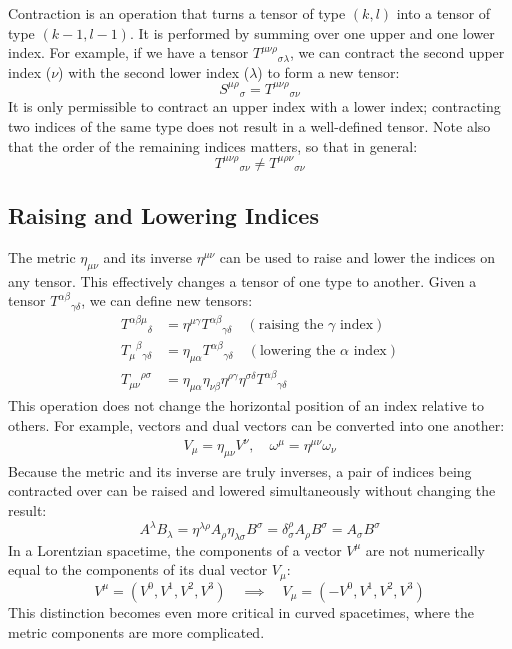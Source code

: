 \documentclass[11pt, a4paper]{report}
\begin{document}
Contraction is an operation that turns a tensor of type $(k, l)$ into a tensor of type $(k-1, l-1)$. It is performed by summing over one upper and one lower index. For example, if we have a tensor ${T^{\mu\nu\rho}}_{\sigma\lambda}$, we can contract the second upper index ($\nu$) with the second lower index ($\lambda$) to form a new tensor:
\begin{equation}
    {S^{\mu\rho}}_\sigma = {T^{\mu\nu\rho}}_{\sigma\nu}
\end{equation}
It is only permissible to contract an upper index with a lower index; contracting two indices of the same type does not result in a well-defined tensor. Note also that the order of the remaining indices matters, so that in general:
\begin{equation}
    {T^{\mu\nu\rho}}_{\sigma\nu} \ne {T^{\mu\rho\nu}}_{\sigma\nu}
\end{equation}

\subsection*{Raising and Lowering Indices}

The metric $\eta_{\mu\nu}$ and its inverse $\eta^{\mu\nu}$ can be used to raise and lower the indices on any tensor. This effectively changes a tensor of one type to another. Given a tensor ${T^{\alpha\beta}}_{\gamma\delta}$, we can define new tensors:
\begin{align}
    {T^{\alpha\beta\mu}}_\delta &= \eta^{\mu\gamma} {T^{\alpha\beta}}_{\gamma\delta} \quad (\text{raising the } \gamma \text{ index}) \\
    {T_\mu}^{\beta}{}_{\gamma\delta} &= \eta_{\mu\alpha} {T^{\alpha\beta}}_{\gamma\delta} \quad (\text{lowering the } \alpha \text{ index}) \\
    {T_{\mu\nu}}^{\rho\sigma} &= \eta_{\mu\alpha}\eta_{\nu\beta}\eta^{\rho\gamma}\eta^{\sigma\delta} {T^{\alpha\beta}}_{\gamma\delta}
\end{align}
This operation does not change the horizontal position of an index relative to others. For example, vectors and dual vectors can be converted into one another:
\begin{align}
    V_\mu = \eta_{\mu\nu}V^\nu, \quad \omega^\mu = \eta^{\mu\nu}\omega_\nu
\end{align}
Because the metric and its inverse are truly inverses, a pair of indices being contracted over can be raised and lowered simultaneously without changing the result:
\begin{equation}
    A^\lambda B_\lambda = \eta^{\lambda\rho}A_\rho \eta_{\lambda\sigma}B^\sigma = \delta^\rho_\sigma A_\rho B^\sigma = A_\sigma B^\sigma
\end{equation}
In a Lorentzian spacetime, the components of a vector $V^\mu$ are not numerically equal to the components of its dual vector $V_\mu$:
\begin{equation}
    V^\mu = (V^0, V^1, V^2, V^3) \quad \implies \quad V_\mu = (-V^0, V^1, V^2, V^3)
\end{equation}
This distinction becomes even more critical in curved spacetimes, where the metric components are more complicated.
\end{document}
